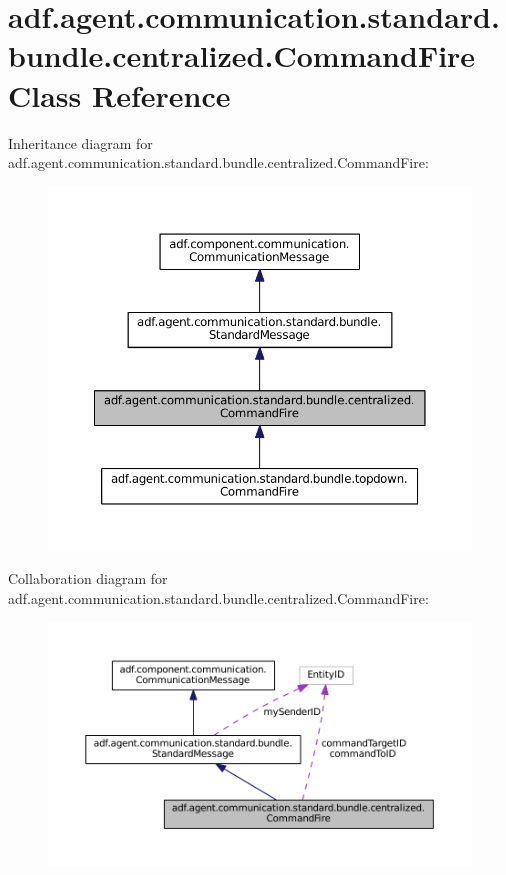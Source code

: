 \hypertarget{classadf_1_1agent_1_1communication_1_1standard_1_1bundle_1_1centralized_1_1CommandFire}{}\section{adf.\+agent.\+communication.\+standard.\+bundle.\+centralized.\+Command\+Fire Class Reference}
\label{classadf_1_1agent_1_1communication_1_1standard_1_1bundle_1_1centralized_1_1CommandFire}


Inheritance diagram for adf.\+agent.\+communication.\+standard.\+bundle.\+centralized.\+Command\+Fire\+:
\nopagebreak
\begin{figure}[H]
\begin{center}
\leavevmode
\includegraphics[width=350pt]{classadf_1_1agent_1_1communication_1_1standard_1_1bundle_1_1centralized_1_1CommandFire__inherit__graph}
\end{center}
\end{figure}


Collaboration diagram for adf.\+agent.\+communication.\+standard.\+bundle.\+centralized.\+Command\+Fire\+:
\nopagebreak
\begin{figure}[H]
\begin{center}
\leavevmode
\includegraphics[width=350pt]{classadf_1_1agent_1_1communication_1_1standard_1_1bundle_1_1centralized_1_1CommandFire__coll__graph}
\end{center}
\end{figure}
